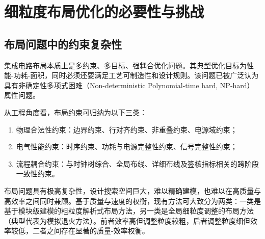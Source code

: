 \section{细粒度布局优化的必要性与挑战}
\label{sec:chap4-necessity-challenges}

\subsection{布局问题中的约束复杂性}
\label{sec:chap4-constraints-complexity}

集成电路布局本质上是多约束、多目标、强耦合优化问题。其典型优化目标为性能-功耗-面积，同时必须还要满足工艺可制造性和设计规则。该问题已被广泛认为具有非确定性多项式困难（Non-deterministic Polynomial-time hard, NP-hard）属性问题。

从工程角度看，布局约束可归纳为以下三类：
\begin{enumerate}
    \item 物理合法性约束：边界约束、行对齐约束、非重叠约束、电源域约束；
    \item 电气性能约束：时序约束、功耗与电源完整性约束、信号完整性约束；
    \item 流程耦合约束：与时钟树综合、全局布线、详细布线及签核指标相关的跨阶段一致性约束。
\end{enumerate}

布局问题具有极高复杂性，设计搜索空间巨大，难以精确建模，也难以在高质量与高效率之间同时兼顾。基于质量与速度的权衡，现有方法可大致分为两类：一类是基于模块级建模的粗粒度解析式布局方法，另一类是全局细粒度调整的布局方法（典型代表为模拟退火方法）。前者效率高但调整粒度较粗，后者调整粒度细但效率较低，二者之间存在显著的质量-效率权衡。




